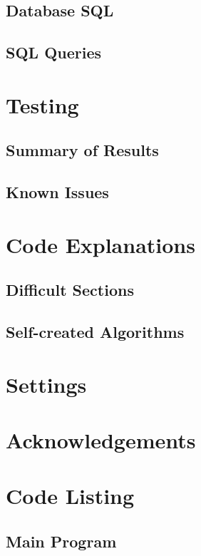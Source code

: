\subsection{Database SQL}

\subsection{SQL Queries}

\section{Testing}

\subsection{Summary of Results}

\subsection{Known Issues}

\section{Code Explanations}

\subsection{Difficult Sections}

\subsection{Self-created Algorithms}

\section{Settings}

\section{Acknowledgements}

\pagebreak

\section{Code Listing}


\subsection{Main Program}
\pagebreak

